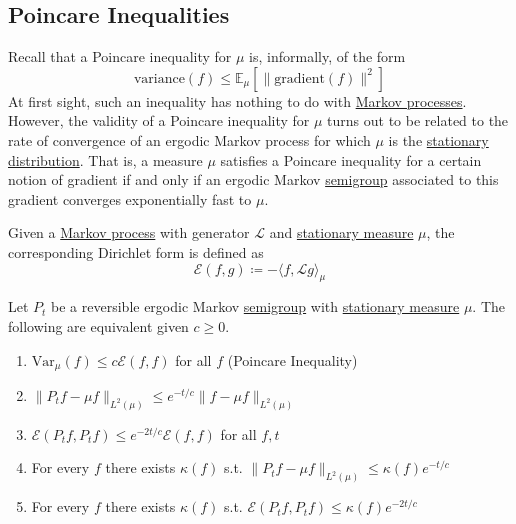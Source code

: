 \subsection{Poincare Inequalities}

  Recall that a Poincare inequality for $\mu$ is, informally, of the form 
  \begin{equation}
    \mathrm{variance}(f) \leq \mathbb{E}_\mu[ \|\mathrm{gradient}(f)\|^2 ]
  \end{equation}
  At first sight, such an inequality has nothing to do with \hyperref[def:markov-process]{Markov processes}. However, the validity of a Poincare inequality for $\mu$ turns out to be related to the rate of convergence of an ergodic Markov process for which $\mu$ is the \hyperref[sp-def:stationary-distribution]{stationary distribution}. That is, a measure $\mu$ satisfies a Poincare inequality for a certain notion of gradient if and only if an ergodic Markov \hyperref[alg-def:semigroup]{semigroup} associated to this gradient converges exponentially fast to $\mu$. 

  \begin{definition}
    \label{def:dirichlet-form}
  Given a \hyperref[def:markov-process]{Markov process} with generator $\mathscr{L}$ and \hyperref[def:stationary-measure]{stationary measure} $\mu$, the corresponding Dirichlet form is defined as 
  \begin{equation}
    \mathcal{E}(f, g) \coloneqq - \langle f, \mathscr{L} g \rangle_\mu
  \end{equation}
  \end{definition}

  \begin{theorem}
    \label{thm:poincare-inequality}
  Let $P_t$ be a reversible ergodic Markov \hyperref[alg-def:semigroup]{semigroup} with \hyperref[def:stationary-measure]{stationary measure} $\mu$. The following are equivalent given $c \geq 0$. 
  \begin{enumerate}
      \item $\mathrm{Var}_\mu (f) \leq c \mathcal{E}(f, f)$ for all $f$ (Poincare Inequality) 
      \item $\|P_t f - \mu f\|_{L^2 (\mu)} \leq e^{-t /c} \|f - \mu f\|_{L^2 (\mu)}$
      \item $\mathcal{E}(P_t f, P_t f) \leq e^{-2t /c} \mathcal{E}(f, f)$ for all $f, t$
      \item For every $f$ there exists $\kappa (f)$ s.t. $\|P_t f - \mu f\|_{L^2 (\mu)} \leq \kappa(f) e^{-t/c}$
      \item For every $f$ there exists $\kappa (f)$ s.t. $\mathcal{E}(P_t f, P_t f) \leq \kappa(f) e^{-2t/c}$ 
  \end{enumerate}
  \end{theorem}


